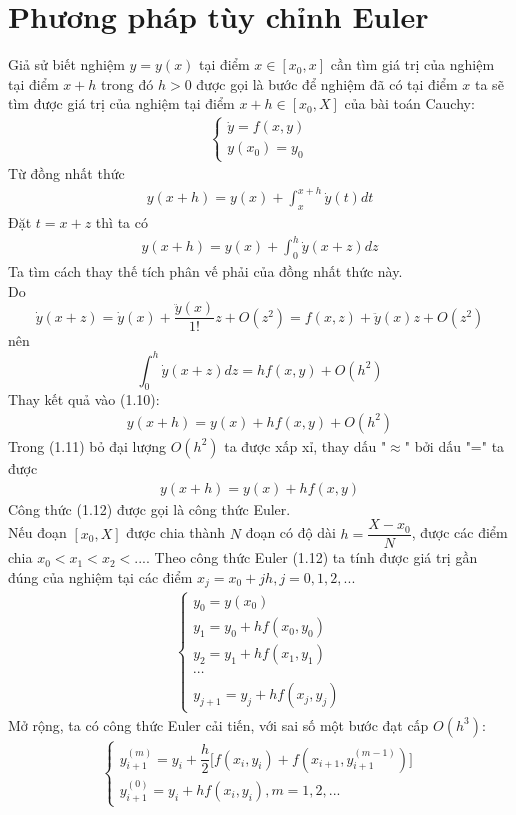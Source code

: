 \documentclass[12pt,a4paper]{report}
\begin{document}
\section{Phương pháp tùy chỉnh Euler}
Giả sử biết nghiệm $y=y(x)$ tại điểm $x \in [x_0, x]$ cần tìm giá trị của nghiệm tại điểm $x+h$ trong đó $h > 0$ được gọi là bước để nghiệm đã có tại điểm $x$ ta sẽ tìm được giá trị của nghiệm tại điểm $x+h \in [x_0,X]$ của bài toán Cauchy: 
\begin{eqnarray}
	\begin{cases}
		\dot{y}=f(x, y) \\ y(x_0) = y_0
	\end{cases}
\end{eqnarray} 
Từ đồng nhất thức 
\begin{eqnarray}
	y(x+h) = y(x) + \int_{x}^{x+h}\dot{y}(t)dt
\end{eqnarray}
Đặt $t=x+z$ thì ta có 
\begin{eqnarray}
	y(x+h) = y(x) + \int_{0}^{h}\dot{y}(x+z)dz
\end{eqnarray}
Ta tìm cách thay thế tích phân vế phải của đồng nhất thức này.\\ Do $$\dot{y}(x+z) = \dot{y}(x) + \dfrac{\ddot{y}(x)}{1!}z + O(z^2) = f(x,z) + \ddot{y}(x)z + O(z^2)$$ nên $$\int_{0}^{h}\dot{y}(x+z)dz = hf(x,y) + O(h^2)$$ 
Thay kết quả vào (1.10): \begin{eqnarray}
	y(x+h) = y(x)+hf(x,y) + O(h^2)
\end{eqnarray}	
Trong (1.11) bỏ đại lượng $O(h^2)$ ta được xấp xỉ, thay dấu "$\approx$" bởi dấu "=" ta được \begin{eqnarray}
	y(x+h) = y(x) +hf(x,y)
\end{eqnarray}
Công thức (1.12) được gọi là công thức Euler.\\
Nếu đoạn $[x_0,X]$ được chia thành $N$ đoạn có độ dài $h=\dfrac{X-x_0}{N}$, được các điểm chia $x_0<x_1<x_2<...$. Theo công thức Euler (1.12) ta tính được giá trị gần đúng của nghiệm tại các điểm $x_j=x_0+jh, j=0,1,2,...$
\begin{eqnarray}
	\begin{cases}
		y_0=y(x_0)\\y_1=y_0+hf(x_0,y_0)\\y_2=y_1+hf(x_1,y_1)\\\cdots\\y_{j+1} = y_j+hf(x_j,y_j)
	\end{cases} \nonumber
\end{eqnarray}
Mở rộng, ta có công thức Euler cải tiến, với sai số một bước đạt cấp $O(h^3)$:
\begin{eqnarray}
	\begin{cases}
		y^{(m)}_{i+1} = y_i + \dfrac{h}{2}\big[f(x_i,y_i) + f(x_{i+1},y^{(m-1)}_{i+1})\big] \\ y^{(0)}_{i+1} = y_i + hf(x_i,y_i), m=1,2,...
	\end{cases} \nonumber
\end{eqnarray}
\end{document}

